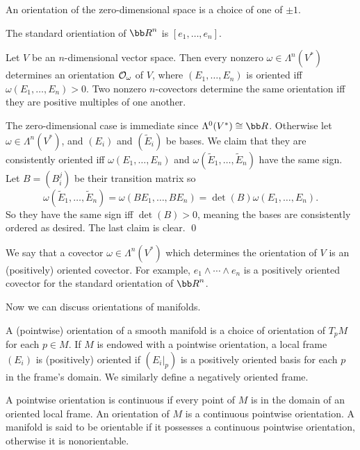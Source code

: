     An orientation of the zero-dimensional space is a choice of one of $\pm1$.

\edefn

\bexam

    The {\emphcolor standard orientiation} of $\bR^n$ is $[e_1,\dots,e_n]$.

\eexam

\bprop

    Let $V$ be an $n$-dimensional vector space.
    Then every nonzero $\omega\in\Lambda^n(V^*)$ determines an orientation ${{\cal O}}_\omega$ of $V$, where $(E_1,\dots,E_n)$ is oriented iff $\omega(E_1,\dots,E_n)>0$.
    Two nonzero $n$-covectors determine the same orientation iff they are positive multiples of one another.

\eprop

\bproof

    The zero-dimensional case is immediate since $\Lambda^0(V^*)\cong\bR$.
    Otherwise let $\omega\in\Lambda^n(V^*)$, and $(E_i)$ and $(\tilde E_i)$ be bases.
    We claim that they are consistently oriented iff $\omega(E_1,\dots,E_n)$ and $\omega(\tilde E_1,\dots,\tilde E_n)$ have the same sign.
    Let $B=(B^j_i)$ be their transition matrix so
    $$ \omega(\tilde E_1,\dots,\tilde E_n) = \omega(BE_1,\dots,BE_n) = \det(B)\omega(E_1,\dots,E_n) . $$
    So they have the same sign iff $\det(B)>0$, meaning the bases are consistently ordered as desired.
    The last claim is clear.
    \qed

\eproof

We say that a covector $\omega\in\Lambda^n(V^*)$ which determines the orientation of $V$ is an {\emphcolor (positively) oriented covector}.
For example, $e_1\wedge\cdots\wedge e_n$ is a positively oriented covector for the standard orientation of $\bR^n$.

Now we can discuss orientations of manifolds.

\bdefn

    A {\emphcolor (pointwise) orientation} of a smooth manifold is a choice of orientation of $T_pM$ for each $p\in M$.
    If $M$ is endowed with a pointwise orientation, a local frame $(E_i)$ is {\emphcolor (positively) oriented} if $(E_i|_p)$
    is a positively oriented basis for each $p$ in the frame's domain.
    We similarly define a negatively oriented frame.

    A pointwise orientation is {\emphcolor continuous} if every point of $M$ is in the domain of an oriented local frame.
    An {\emphcolor orientation} of $M$ is a continuous pointwise orientation.
    A manifold is said to be {\emphcolor orientable} if it possesses a continuous pointwise orientation, otherwise it is
    {\emphcolor nonorientable}.


